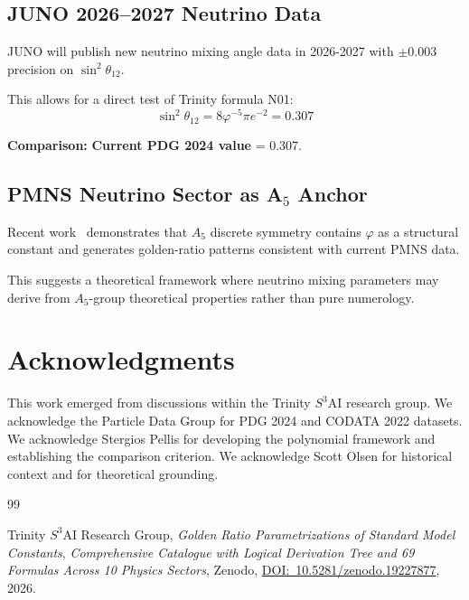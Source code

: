 \documentclass{article}
\begin{document}
\begin{table}[h]
\subsection*{JUNO 2026--2027 Neutrino Data}

JUNO will publish new neutrino mixing angle data in 2026-2027 with
$\pm 0.003$ precision on $\sin^2\theta_{12}$.

This allows for a direct test of Trinity formula N01:
\begin{equation}
  \sin^2\theta_{12} = 8\varphi^{-5}\pi e^{-2} = 0.307
  \label{eq:theta12}
\end{equation}

\textbf{Comparison:} \textbf{Current PDG 2024 value} = 0.307.

\subsection*{PMNS Neutrino Sector as A$_5$ Anchor}

Recent work~\cite{PLB2025} demonstrates that $A_5$ discrete symmetry
contains $\varphi$ as a structural constant and generates golden-ratio patterns
consistent with current PMNS data.

This suggests a theoretical framework where neutrino mixing parameters may derive
from $A_5$-group theoretical properties rather than pure numerology.

\medskip

\section*{Acknowledgments}

This work emerged from discussions within the Trinity $S^3$AI research group.
We acknowledge the Particle Data Group for PDG 2024 and CODATA 2022 datasets.
We acknowledge Stergios Pellis for developing the polynomial framework and
establishing the comparison criterion.
We acknowledge Scott Olsen for historical context and for theoretical grounding.

\medskip

\begin{thebibliography}{99}

Trinity $S^3$AI Research Group,
\textit{Golden Ratio Parametrizations of Standard Model Constants},
\textit{Comprehensive Catalogue with Logical Derivation Tree and 69 Formulas Across 10 Physics Sectors},
Zenodo,
\href{https://doi.org/10.5281/zenodo.19227877}{DOI:~10.5281/zenodo.19227877}, 2026.


\end{thebibliography}
\end{table}
\end{document}

